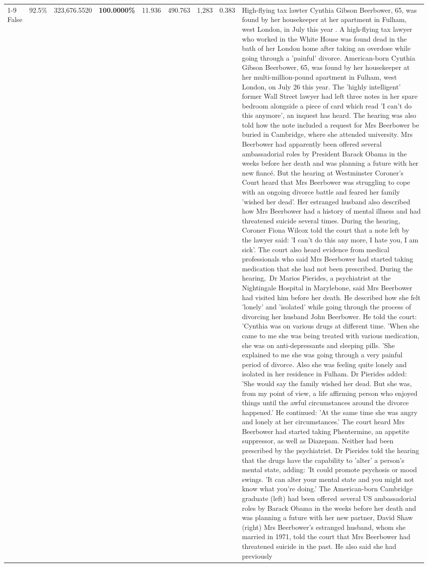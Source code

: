 \begin{table}[H]
\begin{tabular}{lllrlllll}
\cline{1-9}
False & 92.5\% & 323,676.5520 & \bfseries \color{red} 100.0000\% & 11.936 & 490.763 & 1,283 & 0.383 & High-flying tax lawter Cynthia Gibson Beerbower, 65, was found by her housekeeper at her apartment in Fulham, west London, in July this year . A high-flying tax lawyer who worked in the White House was found dead in the bath of her London home after taking an overdose while going through a 'painful' divorce. American-born Cynthia Gibson Beerbower, 65, was found by her housekeeper at her multi-million-pound apartment in Fulham, west London, on July 26 this year. The 'highly intelligent' former Wall Street lawyer had left three notes in her spare bedroom alongside a piece of card which read 'I can't do this anymore', an inquest has heard. The hearing was also told how the note included a request for Mrs Beerbower be buried in Cambridge, where she attended university. Mrs Beerbower had apparently been offered several ambassadorial roles by President Barack Obama in the weeks before her death and was planning a future with her new fiancé. But the hearing at Westminster Coroner's Court heard that Mrs Beerbower was struggling to cope with an ongoing divorce battle and feared her family 'wished her dead'. Her estranged husband also described how Mrs Beerbower had a history of mental illness and had threatened suicide several times. During the hearing, Coroner Fiona Wilcox told the court that a note left by the lawyer said: 'I can't do this any more, I hate you, I am sick'. The court also heard evidence from medical professionals who said Mrs Beerbower had started taking medication that she had not been prescribed. During the hearing, Dr Marios Pierides, a psychiatrist at the Nightingale Hospital in Marylebone, said Mrs Beerbower had visited him before her death. He described how she felt 'lonely' and 'isolated' while going through the process of divorcing her husband John Beerbower. He told the court: 'Cynthia was on various drugs at different time. 'When she came to me she was being treated with various medication, she was on anti-depressants and sleeping pills. 'She explained to me she was going through a very painful period of divorce. Also she was feeling quite lonely and isolated in her residence in Fulham. Dr Pierides added: 'She would say the family wished her dead. But she was, from my point of view, a life affirming person who enjoyed things until the awful circumstances around the divorce happened.' He continued: 'At the same time she was angry and lonely at her circumstances.' The court heard Mrs Beerbower had started taking Phentermine, an appetite suppressor, as well as Diazepam. Neither had been prescribed by the psychiatrist. Dr Pierides told the hearing that the drugs have the capability to 'alter' a person's mental state, adding: 'It could promote psychosis or mood swings. 'It can alter your mental state and you might not know what you're doing.' The American-born Cambridge graduate (left) had been offered several US ambassadorial roles by Barack Obama in the weeks before her death and was planning a future with her new partner, David Shaw (right) Mrs Beerbower's estranged husband, whom she married in 1971, told the court that Mrs Beerbower had threatened suicide in the past. He also said she had previously 
\end{tabular}
\end{table}
